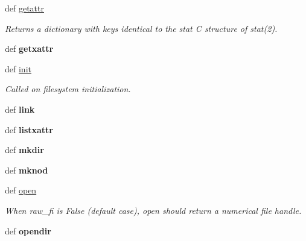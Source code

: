 \begin{DoxyCompactItemize}
\item 
def \hyperlink{classfuse_1_1Operations_a60cb99a093a1e504232d5c92ca5459ee}{getattr}
\begin{DoxyCompactList}\small\item\em Returns a dictionary with keys identical to the stat C structure of stat(2). \end{DoxyCompactList}\item 
\hypertarget{classfuse_1_1Operations_a4b043b97d65d9d297f8bbc9d79e96ec6}{def {\bfseries getxattr}}\label{classfuse_1_1Operations_a4b043b97d65d9d297f8bbc9d79e96ec6}

\item 
def \hyperlink{classfuse_1_1Operations_aa1201952b200806c3e34a805e370cb29}{init}
\begin{DoxyCompactList}\small\item\em Called on filesystem initialization. \end{DoxyCompactList}\item 
\hypertarget{classfuse_1_1Operations_a7f80314da4bc5daf92ced6745685b47e}{def {\bfseries link}}\label{classfuse_1_1Operations_a7f80314da4bc5daf92ced6745685b47e}

\item 
\hypertarget{classfuse_1_1Operations_ae5c8da7b1b2e501dcf6779acb7674427}{def {\bfseries listxattr}}\label{classfuse_1_1Operations_ae5c8da7b1b2e501dcf6779acb7674427}

\item 
\hypertarget{classfuse_1_1Operations_ac996124e74a27657f7d290ba4df70bcb}{def {\bfseries mkdir}}\label{classfuse_1_1Operations_ac996124e74a27657f7d290ba4df70bcb}

\item 
\hypertarget{classfuse_1_1Operations_a62c63194cb89b7994d57caf237a08d44}{def {\bfseries mknod}}\label{classfuse_1_1Operations_a62c63194cb89b7994d57caf237a08d44}

\item 
def \hyperlink{classfuse_1_1Operations_ac14964908cb9f44dd6bb78d22205cd17}{open}
\begin{DoxyCompactList}\small\item\em When raw\-\_\-fi is False (default case), open should return a numerical file handle. \end{DoxyCompactList}\item 
\hypertarget{classfuse_1_1Operations_a37e30fe9a2a0ae964f3c4d420979ce14}{def {\bfseries opendir}}\label{classfuse_1_1Operations_a37e30fe9a2a0ae964f3c4d420979ce14}


\end{DoxyCompactItemize}
